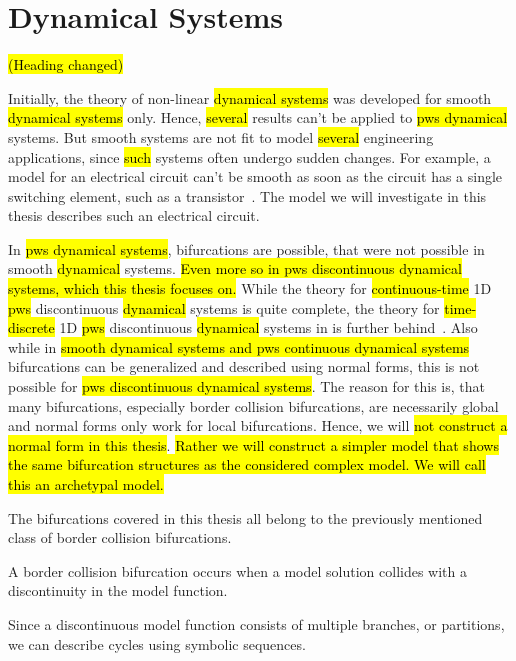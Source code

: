 \section{ Dynamical Systems}
\label{sec:state.discont}

\hl{(Heading changed)}

Initially, the theory of non-linear \hl{dynamical systems} was developed for smooth \hl{dynamical systems} only.
Hence, \hl{several} results can't be applied to \hl{\gls{pws} dynamical} systems.
But smooth systems are not fit to model \hl{several} engineering applications, since \hl{such} systems often undergo sudden changes.
For example, a model for an electrical circuit can't be smooth as soon as the circuit has a single switching element, such as a transistor~\cite{ZhuMos03}.
The model we will investigate in this thesis describes such an electrical circuit.

In \hl{\gls{pws} dynamical systems}, bifurcations are possible, that were not possible in smooth \hl{dynamical} systems.
\hl{Even more so in \gls{pws} discontinuous dynamical systems, which this thesis focuses on.}
While the theory for \hl{continuous-time} 1D \hl{\gls{pws}} discontinuous \hl{dynamical} systems is quite complete, the theory for \hl{time-discrete} 1D \hl{\gls{pws}} discontinuous \hl{dynamical} systems in is further behind~\cite{Simpson16}.
Also while in \hl{smooth dynamical systems and \gls{pws} continuous dynamical systems} bifurcations can be generalized and described using normal forms, this is not possible for \hl{\gls{pws} discontinuous dynamical systems}.
The reason for this is, that many bifurcations, especially border collision bifurcations, are necessarily global and normal forms only work for local bifurcations.
Hence, we will \hl{not construct a normal form in this thesis}.
\hl{
	Rather we will construct a simpler model that shows the same bifurcation structures as the considered complex model.
	We will call this an archetypal model.
}

The bifurcations covered in this thesis all belong to the previously mentioned class of border collision bifurcations.

\begin{definition}
	A border collision bifurcation occurs when a model solution collides with a discontinuity in the model function.
\end{definition}

Since a discontinuous model function consists of multiple branches, or partitions, we can describe cycles using symbolic sequences.

